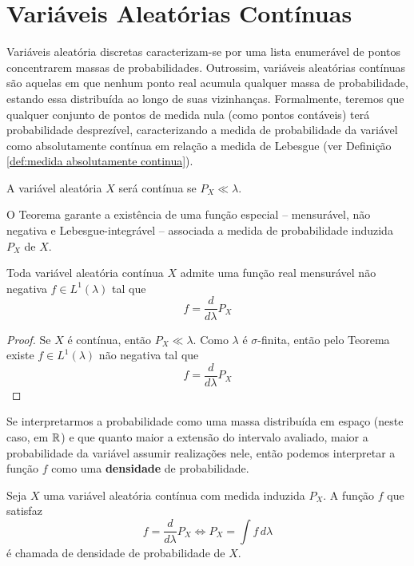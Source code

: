 \section{Variáveis Aleatórias Contínuas}

Variáveis aleatória discretas caracterizam-se por uma lista enumerável de pontos
concentrarem massas de probabilidades.
Outrossim, variáveis aleatórias contínuas são aquelas em que nenhum ponto real
acumula qualquer massa de probabilidade, estando essa distribuída ao longo de suas
vizinhanças.
Formalmente, teremos que qualquer conjunto de pontos de medida nula (como pontos contáveis)
terá probabilidade desprezível, caracterizando a medida de probabilidade da variável como
absolutamente contínua em relação a medida de Lebesgue
(ver Definição \ref{def:medida absolutamente continua}).

\begin{def:variavel continua}
A variável aleatória $X$ será contínua se $P_X \ll \lambda$.
\end{def:variavel continua}

O Teorema  garante a existência de uma função especial
-- mensurável, não negativa e Lebesgue-integrável -- associada a medida de probabilidade
induzida $P_X$ de $X$.

\begin{prop:existencia fdp}
Toda variável aleatória contínua $X$ admite uma função real mensurável não negativa
$f \in L^1(\lambda)$ tal que
\[
	f = \frac{d}{d\lambda} P_X
\]
\begin{proof}
	Se $X$ é contínua, então $P_X \ll \lambda$. Como $\lambda$ é $\sigma$-finita, então
	pelo Teorema  existe $f \in L^1(\lambda)$ não negativa
	tal que
	\[
		f = \frac{d}{d\lambda} P_X
	\]
\end{proof}
\end{prop:existencia fdp}

Se interpretarmos a probabilidade como uma massa distribuída em espaço (neste caso,
em $\mathbb{R}$) e que quanto maior a extensão do intervalo avaliado, maior a probabilidade
da variável assumir realizações nele, então podemos interpretar a função $f$ como
uma \textbf{densidade} de probabilidade.

\begin{def:fdp}
Seja $X$ uma variável aleatória contínua com medida induzida $P_X$. A função $f$
que satisfaz
\[
	f = \frac{d}{d\lambda}P_X \Longleftrightarrow P_X = \int f\, d\lambda
\]
é chamada de densidade de probabilidade de $X$.
\end{def:fdp}

